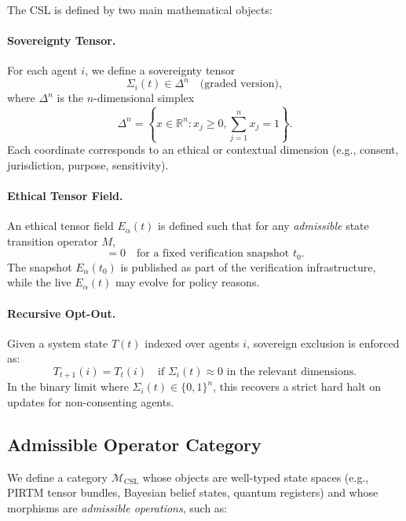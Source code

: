 \documentclass[11pt]{article}
\begin{document}
The CSL is defined by two main mathematical objects:

\paragraph{Sovereignty Tensor.}
For each agent $i$, we define a sovereignty tensor
\begin{equation}
  \Sigma_i(t) \in \Delta^n
  \quad\text{(graded version)},
  \label{eq:graded-sigma}
\end{equation}
where $\Delta^n$ is the $n$-dimensional simplex
\[
  \Delta^n = \left\{ x \in \mathbb{R}^n : x_j \ge 0, \sum_{j=1}^n x_j = 1 \right\}.
\]
Each coordinate corresponds to an ethical or contextual dimension (e.g., consent, jurisdiction, purpose, sensitivity).

\paragraph{Ethical Tensor Field.}
An ethical tensor field $E_\alpha(t)$ is defined such that for any \emph{admissible} state transition operator $M$,
\begin{equation}
  [M, E_\alpha(t_0)] = 0
  \quad\text{for a fixed verification snapshot } t_0.
  \label{eq:ethical-commutator}
\end{equation}
The snapshot $E_\alpha(t_0)$ is published as part of the verification infrastructure, while the live $E_\alpha(t)$ may evolve
for policy reasons.

\paragraph{Recursive Opt-Out.}
Given a system state $T(t)$ indexed over agents $i$, sovereign exclusion is enforced as:
\begin{equation}
  T_{t+1}(i) = T_t(i)
  \quad\text{if } \Sigma_i(t) \approx 0 \text{ in the relevant dimensions}.
  \label{eq:opt-out}
\end{equation}
In the binary limit where $\Sigma_i(t) \in \{0,1\}^n$, this recovers a strict hard halt on updates for non-consenting agents.

\subsection{Admissible Operator Category}

We define a category $\mathcal{M}_{\mathrm{CSL}}$ whose objects are well-typed state spaces
(e.g., PIRTM tensor bundles, Bayesian belief states, quantum registers)
and whose morphisms are \emph{admissible operations}, such as:
\end{document}
